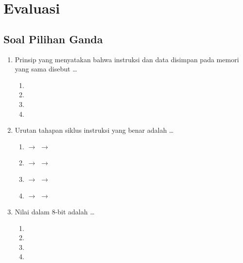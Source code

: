 \section{Evaluasi}
\label{sec:evaluasi-bab2}

\subsection{Soal Pilihan Ganda}

\begin{enumerate}
    \item Prinsip yang menyatakan bahwa instruksi dan data disimpan
          pada memori yang sama disebut \dots
          \begin{enumerate}
              \item {}
              \item {}
              \item {}
              \item {}
          \end{enumerate}

    \item Urutan tahapan siklus instruksi yang benar adalah \dots
          \begin{enumerate}
              \item {} $\rightarrow$ 
                    $\rightarrow$ 
              \item {} $\rightarrow$ 
                    $\rightarrow$ 
              \item {} $\rightarrow$ 
                    $\rightarrow$ 
              \item {} $\rightarrow$ 
                    $\rightarrow$ 
          \end{enumerate}

    \item Nilai  dalam 8-bit  adalah
          \dots
          \begin{enumerate}
              \item {} \item {}
              \item {} \item {}
          \end{enumerate}


\end{enumerate}

